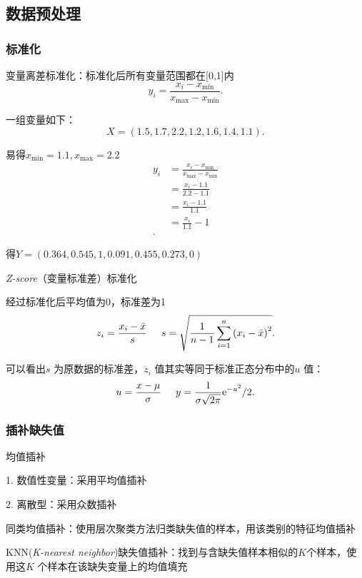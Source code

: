 \subsection{数据预处理}%
\label{sub:数据预处理}
\subsubsection{标准化}%
\label{subsub:标准化}
\begin{notation}
    变量离差标准化：标准化后所有变量范围都在[0,1]内
    \[
        y_{i}=\frac{x_{i}-x_{\min}}{x_{\max}-x_{\min}}
    .\] 
\end{notation}
\begin{eg}
    一组变量如下：
    \[
        X=\left( 1.5,1.7,2.2,1.2,1.6,1.4,1.1 \right) 
    .\] 

    易得$x_{\min}=1.1,x_{\max}=2.2$
    \begin{align*}
        y_{i}&= \frac{x_{i}-x_{\min}}{x_{\max}-x_{\min}}\\
        &= \frac{x_{i}-1.1}{2.2-1.1} \\
        &= \frac{x_{i}-1.1}{1.1} \\
        &= \frac{x_{i}}{1.1}-1 \\
    .\end{align*}

    得$Y=\left( 0.364,0.545,1,0.091,0.455,0.273,0 \right) $
\end{eg}
\begin{notation}
    \textit{Z-score}（变量标准差）标准化

    经过标准化后平均值为0，标准差为1
    \[
        z_i=\frac{x_{i}-\bar{x}}{s} \hspace{0.5cm} s=\sqrt{\frac{1}{n-1}\sum_{i=1}^{n} \left( x_{i}-\bar{x} \right) ^2} 
    .\] 

    可以看出$s$ 为原数据的标准差，$z_i$ 值其实等同于标准正态分布中的$u$ 值：
    \[
        u=\frac{x-\mu}{\sigma} \hspace{0.5cm} y=\frac{1}{\sigma\sqrt{2\pi} }\mathrm{e}^{-u^2}/2
    .\] 
\end{notation}
\subsubsection{插补缺失值}%
\label{subsub:插补缺失值}
\begin{notation}
    均值插补

    1. 数值性变量：采用平均值插补

    2. 离散型：采用众数插补
\end{notation}
\begin{notation}
    同类均值插补：使用层次聚类方法归类缺失值的样本，用该类别的特征均值插补
\end{notation}
\begin{notation}
    KNN(\textit{K-nearest neighbor})缺失值插补：找到与含缺失值样本相似的$K$个样本，使用这$K$ 个样本在该缺失变量上的均值填充
\end{notation}


